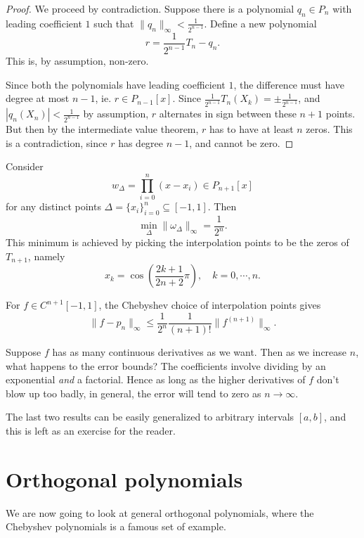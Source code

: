 \documentclass[a4paper]{article}
\begin{document}
\begin{proof}
  We proceed by contradiction. Suppose there is a polynomial $q_n \in P_n$ with leading coefficient $1$ such that $\|q_n\|_{\infty} < \frac{1}{2^{n - 1}}$. Define a new polynomial
  \[
    r = \frac{1}{2^{n - 1}}T_n - q_n.
  \]
  This is, by assumption, non-zero.

  Since both the polynomials have leading coefficient $1$, the difference must have degree at most $n - 1$, ie. $r \in P_{n - 1}[x]$. Since $\frac{1}{2^{n - 1}}T_n(X_k) = \pm \frac{1}{2^{n - 1}}$, and $|q_n(X_n)| < \frac{1}{2^{n - 1}}$ by assumption, $r$ alternates in sign between these $n + 1$ points. But then by the intermediate value theorem, $r$ has to have at least $n$ zeros. This is a contradiction, since $r$ has degree $n - 1$, and cannot be zero.
\end{proof}

\begin{cor}
  Consider
  \[
    w_\Delta = \prod_{i = 0}^n (x - x_i) \in P_{n + 1}[x]
  \]
  for any distinct points $\Delta = \{x_i\}_{i = 0}^n \subseteq [-1, 1]$. Then
  \[
    \min_{\Delta} \|\omega_{\Delta}\|_{\infty} = \frac{1}{2^n}.
  \]
  This minimum is achieved by picking the interpolation points to be the zeros of $T_{n + 1}$, namely
  \[
    x_k = \cos\left(\frac{2k + 1}{2n + 2} \pi\right), \quad k = 0, \cdots, n.
  \]
\end{cor}

\begin{thm}
  For $f \in C^{n + 1}[-1, 1]$, the Chebyshev choice of interpolation points gives
  \[
    \|f - p_n\|_{\infty} \leq \frac{1}{2^n} \frac{1}{(n + 1)!} \|f^{(n + 1)}\|_{\infty}.
  \]
\end{thm}
Suppose $f$ has as many continuous derivatives as we want. Then as we increase $n$, what happens to the error bounds? The coefficients involve dividing by an exponential \emph{and} a factorial. Hence as long as the higher derivatives of $f$ don't blow up too badly, in general, the error will tend to zero as $n \to \infty$.

The last two results can be easily generalized to arbitrary intervals $[a, b]$, and this is left as an exercise for the reader.

\section{Orthogonal polynomials}
We are now going to look at general orthogonal polynomials, where the Chebyshev polynomials is a famous set of example.
\end{document}
